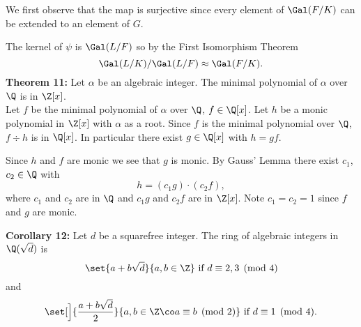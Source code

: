 We first observe that the map is surjective since every element of $\Gal(F/K)$ can be extended to an element of $G$.

The kernel of $\psi$ is $\Gal(L/F)$ so by the First Isomorphism Theorem
\[ \Gal(L/K)/\Gal(L/F) \approx \Gal(F/K) . \]
\textbf{Theorem 11:} Let $\alpha$ be an algebraic integer.  The minimal polynomial of $\alpha$ over $\Q$ is in $\Z[x]$. \\
\pf Let $f$ be the minimal polynomial of $\alpha$ over $\Q$, $f\in\Q[x]$.  Let $h$ be a monic polynomial in $\Z[x]$ with $\alpha$ as a root.  Since $f$ is the minimal polynomial over $\Q$, $f\div h$ is in $\Q[x]$.  In particular there exist $g\in\Q[x]$ with $h=gf$.

Since $h$ and $f$ are monic we see that $g$ is monic.  By Gauss' Lemma there exist $c_1$, $c_2\in\Q$ with
\[ h = (c_1g)\cdot(c_2 f) , \]
where $c_1$ and $c_2$ are in $\Q$ and $c_1g$ and $c_2f$ are in $\Z[x]$.  Note $c_1=c_2=1$ since $f$ and $g$ are monic.

\textbf{Corollary 12:} Let $d$ be a squarefree integer.  The ring of algebraic integers in $\Q(\sqrt d)$ is
\[ \set{a+b\sqrt{d}}{a,b\in\Z} \text{ if $d\equiv2,3\pmod 4$} \]
and
\[ \set[\Big]{\frac{a+b\sqrt{d}}{2}}{a,b\in\Z\co a\equiv b\pmod 2} \text{ if $d\equiv1\pmod 4$} . \]